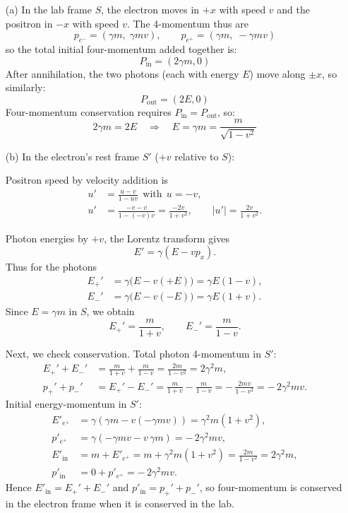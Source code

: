 \documentclass[12pt]{article}
\begin{document}
\begin{enumerate}
  \item[(a)] In the lab frame $S$, the electron moves in $+x$ with speed $v$ and the positron in $-x$ with speed $v$. The 4-momentum thus are
  \[
  p_{e^-}=(\gamma m,\;\gamma m v),\qquad
  p_{e^+}=(\gamma m,\;-\gamma m v)
  \]
  so the total initial four-momentum added together is:
  \[
  P_{\text{in}}=(2\gamma m,0)
  \]
  After annihilation, the two photons (each with energy $E$) move along $\pm x$, so similarly:
  \[
  P_{\text{out}}=(2E,0)
  \]
  Four-momentum conservation requires $P_{\text{in}}=P_{\text{out}}$, so:
  \[
  2\gamma m = 2E \quad\Longrightarrow\quad
  E=\gamma m=\frac{m}{\sqrt{1-v^2}}
  \]
  
  \item[(b)] In the electron’s rest frame $S'$ ($+v$ relative to $S$):
  
Positron speed by velocity addition is 
  \[
  \begin{aligned}
  u'&=\frac{u-v}{1-uv}\ \ \text{with}\ \ u=-v,\\
  u'&=\frac{-v-v}{1-(-v)v}=\frac{-2v}{1+v^2},\qquad
  |u'|=\frac{2v}{1+v^2}.
  \end{aligned}
  \]
  
Photon energies by $+v$, the Lorentz transform gives
  \[
  E'=\gamma(E-vp_x).
  \]
  Thus for the photons
  \[
  \begin{aligned}
  E_+' &= \gamma\big(E-v(+E)\big)=\gamma E(1-v),\\
  E_-' &= \gamma\big(E-v(-E)\big)=\gamma E(1+v).
  \end{aligned}
  \]
  Since $E=\gamma m$ in $S$, we obtain
  \[
  E_+'=\frac{m}{1+v},\qquad
  E_-'
  =\frac{m}{1-v}.
  \]
  
  Next, we check conservation. Total photon 4-momentum in $S'$:
  \[
  \begin{aligned}
  E_+'+E_-'
  &=\frac{m}{1+v}+\frac{m}{1-v}
  =\frac{2m}{1-v^2}
  =2\gamma^2 m,\\[4pt]
  p_+'+p_-'
  &=E_+'-E_-'
  =\frac{m}{1+v}-\frac{m}{1-v}
  =-\,\frac{2mv}{1-v^2}
  =-\,2\gamma^2 m v.
  \end{aligned}
  \]
  Initial energy-momentum in $S'$:
  \[
  \begin{aligned}
  E'_{\!e^+}
  &=\gamma(\gamma m - v(-\gamma m v))
  =\gamma^2 m(1+v^2),\\
  p'_{\!e^+}
  &=\gamma(-\gamma m v - v\,\gamma m)
  =-\,2\gamma^2 m v,\\
  E'_{\text{in}}
  &=m+E'_{\!e^+}
  =m+\gamma^2 m(1+v^2)
  =\frac{2m}{1-v^2}
  =2\gamma^2 m,\\
  p'_{\text{in}}
  &=0+p'_{\!e^+}
  =-\,2\gamma^2 m v.
  \end{aligned}
  \]
  Hence $E'_{\text{in}}=E_+'+E_-'$ and $p'_{\text{in}}=p_+'+p_-'$, so four-momentum is conserved in the electron frame when it is conserved in the lab.
  




\end{enumerate}
\end{document}
